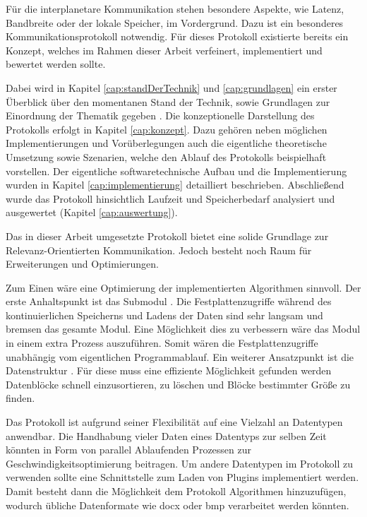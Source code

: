 Für die interplanetare Kommunikation stehen besondere Aspekte, wie Latenz,
Bandbreite oder der lokale Speicher, im Vordergrund. Dazu ist ein besonderes
Kommunikationsprotokoll notwendig. Für dieses Protokoll  existierte
bereits ein Konzept, welches im Rahmen dieser Arbeit verfeinert, implementiert
und bewertet werden sollte.

Dabei wird in Kapitel \ref{cap:standDerTechnik} und \ref{cap:grundlagen} ein
erster Überblick über den momentanen Stand der Technik, sowie Grundlagen zur
Einordnung der Thematik gegeben 
.
Die konzeptionelle Darstellung des Protokolls erfolgt in Kapitel
\ref{cap:konzept}. Dazu gehören neben möglichen Implementierungen und
Vorüberlegungen auch die eigentliche theoretische Umsetzung sowie Szenarien,
welche den Ablauf des Protokolls beispielhaft vorstellen. Der eigentliche
softwaretechnische Aufbau und die Implementierung wurden in Kapitel
\ref{cap:implementierung} detailliert beschrieben. Abschließend wurde das
Protokoll hinsichtlich Laufzeit und Speicherbedarf analysiert und ausgewertet
(Kapitel \ref{cap:auswertung}). 

Das in dieser Arbeit umgesetzte Protokoll bietet eine solide
Grundlage zur Relevanz-Orientierten Kommunikation. Jedoch besteht noch Raum
für Erweiterungen und Optimierungen.

Zum Einen wäre eine Optimierung der implementierten Algorithmen sinnvoll.
Der erste Anhaltspunkt ist das Submodul .
Die Festplattenzugriffe während des kontinuierlichen Speicherns und Ladens der Daten
sind sehr langsam und bremsen das gesamte Modul. Eine Möglichkeit dies zu
verbessern wäre das Modul in einem extra Prozess auszuf{\"u}hren. Somit wären
die Festplattenzugriffe unabhängig vom eigentlichen Programmablauf. Ein
weiterer Ansatzpunkt ist die Datenstruktur . Für diese muss
eine effiziente Möglichkeit gefunden werden Datenblöcke schnell
einzusortieren, zu löschen und Bl{\"o}cke bestimmter Größe zu finden.

Das Protokoll ist aufgrund seiner Flexibilität auf eine Vielzahl an Datentypen
anwendbar. Die Handhabung vieler Daten eines Datentyps zur selben Zeit könnten
in Form von parallel Ablaufenden Prozessen zur Geschwindigkeitsoptimierung
beitragen. Um andere Datentypen im Protokoll zu verwenden sollte eine
Schnittstelle zum Laden von Plugins implementiert werden. Damit besteht dann die
Möglichkeit dem Protokoll Algorithmen hinzuzufügen, wodurch
übliche Datenformate wie docx oder bmp verarbeitet werden k{\"o}nnten.

